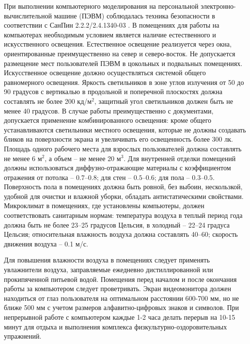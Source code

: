 \SafetyRules
При выполнении компьютерного моделирования на персональной
электронно-вычислительной машине (ПЭВМ) соблюдалась техника безопасности в
соответствии с СанПин 2.2.2/2.4.1340-03 \cite{SanPin}.  В помещениях для работы на
компьютерах необходимым условием является наличие естественного и искусственного
освещения.  Естественное освещение реализуется через окна, ориентированные
преимущественно на север и северо-восток. Не допускается размещение мест
пользователей ПЭВМ в цокольных и подвальных помещениях.  Искусственное освещение
должно осуществляться системой общего равномерного освещения. Яркость
светильников в зоне углов излучения от 50 до 90 градусов с вертикалью в
продольной и поперечной плоскостях должна составлять не более 200 кд/м$^2$,
защитный угол светильников должен быть не менее 40 градусов. В случае работы
преимущественно с документами, допускается применение комбинированного
освещения: кроме общего устанавливаются светильники местного освещения, которые
не должны создавать бликов на поверхности экрана и увеличивать его освещенность
более 300 лк.  Площадь одного рабочего места для взрослых пользователей должна
составлять не менее 6 м$^2$, а объем – не менее 20 м$^3$.  Для внутренней отделки
помещений должны использоваться диффузно-отражающие материалы с коэффициентом
отражения от потолка – $0.7–0.8$; для стен – $0.5–0.6$; для пола – $0.3–0.5$.
Поверхность пола в помещениях должна быть ровной, без выбоин, нескользкой,
удобной для очистки и влажной уборки, обладать антистатическими свойствами.
Микроклимат в помещениях, где установлены компьютеры, должен соответствовать
санитарным нормам: температура воздуха в теплый период года должна быть не более
23–25 градусов Цельсия, в холодный – 22–24 градуса Цельсия; относительная
влажность воздуха должна составлять 40–60; скорость движения воздуха – 0.1 м/с.

Для повышения влажности воздуха в помещениях следует применять увлажнители
воздуха, заправляемые ежедневно дистиллированной или прокипяченной питьевой
водой. Помещения перед началом и после окончания работы за компьютером следует
проветривать.  Экран видеомонитора должен находиться от глаз пользователя на
оптимальном расстоянии 600-700 мм, но не ближе 500 мм с учетом размеров
алфавитно-цифровых знаков и символов. При непрерывной работе с компьютером
каждые 1-2 часа делать перерыв на 10-15 минут для отдыха и выполнения комплекса
физкультурно-оздоровительных упражнений.